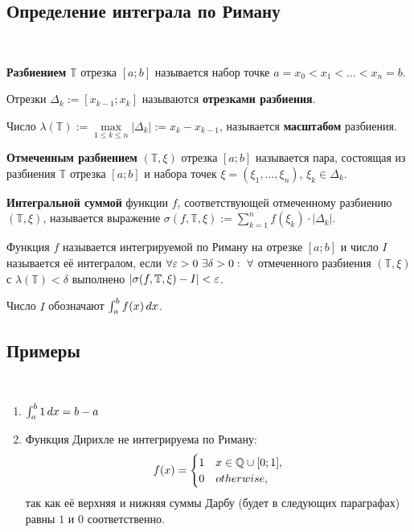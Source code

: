 \documentclass[a4paper]{article}
\theoremstyle{named}
\newcommand{\T}{\mathbb{T}}
\renewcommand{\int}{\intop}
\begin{document}
        \subsection{Определение интеграла по Риману}

        \begin{definition*}~

            \textbf{Разбиением} $\T$ отрезка $[a; b]$ называется набор точке $a = x_0 < x_1 < \dots < x_n = b$.

            Отрезки $\Delta_k := [x_{k - 1}; x_k]$ называются \textbf{отрезками разбиения}.

            Число $\lambda(\T) := \max\limits_{1 \leq k \leq n} |\Delta_k| := x_k - x_{k - 1}$, называется \textbf{масштабом} разбиения.

            \textbf{Отмеченным разбиением} $(\T, \xi)$ отрезка $[a; b]$ называется пара, состоящая из разбиения $\T$ отрезка $[a; b]$ и набора точек $\xi = (\xi_1, \dots, \xi_n)$, $\xi_k \in \Delta_k$.

            \textbf{Интегральной суммой} функции $f$, соответствующей отмеченному разбиению $(\T, \xi)$, называется выражение $\sigma(f, \T, \xi) := \sum_{k = 1}^n f(\xi_k) \cdot |\Delta_k|$.
        \end{definition*}

        \begin{definition*}
            Функция $f$ называется интегрируемой по Риману на отрезке $[a; b]$ и число $I$ называется её интегралом, если $\forall \varepsilon > 0 \ \exists \delta > 0: \ \forall$ отмеченного разбиения $(\T, \xi)$ с $\lambda(\T) < \delta$ выполнено $|\sigma(f, \T, \xi) - I| < \eps$.

            Число $I$ обозначают $\int_a^b f(x) \dd x$.
        \end{definition*}

        \subsection{Примеры}

        \begin{example*}~

            \begin{enumerate}
            \item
                $\int_a^b 1 \dd x = b - a$

            \item
                Функция Дирихле не интегрируема по Риману:
                \begin{equation*}
                	f(x) = \begin{cases}
                		1 &x \in \mathbb{Q} \cup [0; 1], \\
                		0 &otherwise,
                	\end{cases}
                \end{equation*}
                так как её верхняя и нижняя суммы Дарбу (будет в следующих параграфах) равны $1$ и $0$ соответственно.
            \end{enumerate}
        \end{example*}
\end{document}
